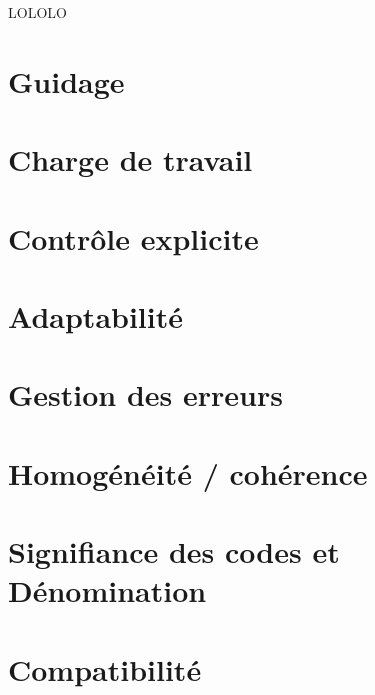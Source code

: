 \documentclass{beamer}
\author {$\{CSI\} \setminus \{\text{Laurent Senta}\}$}
\begin{document}
\begin{frame}
  LOLOLO
  \maketitle
\end{frame}

\section{Guidage}


\section{Charge de travail}


\section{Contrôle explicite}


\section{Adaptabilité}


\section{Gestion des erreurs}


\section{Homogénéité / cohérence}


\section{Signifiance des codes et Dénomination}


\section{Compatibilité}

\end{document}
